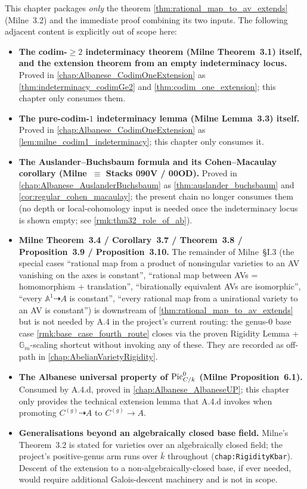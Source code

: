 This chapter packages \emph{only} the theorem
\cref{thm:rational_map_to_av_extends} (Milne~3.2) and the immediate proof combining its
two inputs. The following adjacent content is explicitly out of scope here:
\begin{itemize}
  \item \textbf{The codim-\(\geq 2\) indeterminacy theorem (Milne Theorem~3.1) itself,
    and the extension theorem from an empty indeterminacy locus.} Proved in
    \cref{chap:Albanese_CodimOneExtension} as \cref{thm:indeterminacy_codimGe2}
    and \cref{thm:codim_one_extension}; this chapter only consumes them.
  \item \textbf{The pure-codim-\(1\) indeterminacy lemma (Milne Lemma~3.3) itself.}
    Proved in \cref{chap:Albanese_CodimOneExtension} as
    \cref{lem:milne_codim1_indeterminacy}; this chapter only consumes it.
  \item \textbf{The Auslander--Buchsbaum formula and its Cohen--Macaulay corollary
    (Milne~\(\equiv\) Stacks 090V / 00OD).} Proved in
    \cref{chap:Albanese_AuslanderBuchsbaum} as \cref{thm:auslander_buchsbaum} and
    \cref{cor:regular_cohen_macaulay}; the present chain no longer consumes them
    (no depth or local-cohomology input is needed once the indeterminacy locus
    is shown empty; see \cref{rmk:thm32_role_of_ab}).
  \item \textbf{Milne Theorem~3.4 / Corollary~3.7 / Theorem~3.8 / Proposition~3.9 /
    Proposition~3.10.} The remainder of Milne~\S I.3 (the special cases ``rational map
    from a product of nonsingular varieties to an AV vanishing on the axes is constant'',
    ``rational map between AVs = homomorphism + translation'', ``birationally equivalent
    AVs are isomorphic'', ``every \(\mathbb A^1 \dashrightarrow A\) is constant'',
    ``every rational map from a unirational variety to an AV is constant'') is downstream
    of \cref{thm:rational_map_to_av_extends} but is not needed by A.4 in the project's
    current routing: the genus-\(0\) base case
    \cref{rmk:base_case_fourth_route} closes
    via the proven Rigidity Lemma + \(\mathbb G_m\)-scaling shortcut without invoking any of
    these. They are recorded as off-path in
    \cref{chap:AbelianVarietyRigidity}.
  \item \textbf{The Albanese universal property of \(\operatorname{Pic}^0_{C/k}\) (Milne Proposition~6.1).}
    Consumed by A.4.d, proved in \cref{chap:Albanese_AlbaneseUP}; this chapter only
    provides the technical extension lemma that A.4.d invokes when promoting
    \(C^{(g)} \dashrightarrow A\) to \(C^{(g)} \to A\).
  \item \textbf{Generalisations beyond an algebraically closed base field.} Milne's
    Theorem~3.2 is stated for varieties over an algebraically closed field; the
    project's positive-genus arm runs over \(\bar k\) throughout (\texttt{chap:RigidityKbar}).
    Descent of the extension to a non-algebraically-closed base, if ever needed, would
    require additional Galois-descent machinery and is not in scope.
\end{itemize}
